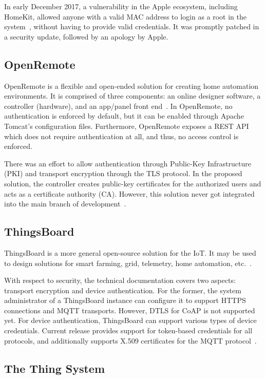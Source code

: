 \documentclass[12pt]{article}
\begin{document}
In early December 2017, a vulnerability in the Apple ecosystem, including HomeKit, allowed anyone with a valid MAC address to login as a root in the system~\cite{related_03}, without having to provide valid credentials. It was promptly patched in a security update, followed by an apology by Apple.

\subsection{OpenRemote}

OpenRemote is a flexible and open-ended solution for creating home automation environments. It is comprised of three components: an online designer software, a controller (hardware), and an app/panel front end~\cite{related_04}. In OpenRemote, no authentication is enforced by default, but it can be enabled through Apache Tomcat's configuration files. Furthermore, OpenRemote exposes a REST API which does not require authentication at all, and thus, no access control is enforced.

There was an effort to allow authentication through Public-Key Infrastructure (PKI) and transport encryption through the TLS protocol. In the proposed solution, the controller creates public-key certificates for the authorized users and acts as a certificate authority (CA). However, this solution never got integrated into the main branch of development~\cite{related_05}. 

\subsection{ThingsBoard}

ThingsBoard is a more general open-source solution for the IoT. It may be used to design solutions for smart farming, grid, telemetry, home automation, etc.~\cite{related_06}.

With respect to security, the technical documentation covers two aspects: transport encryption and device authentication. For the former, the system administrator of a ThingsBoard instance can configure it to support HTTPS connections and MQTT transports. However, DTLS for CoAP is not supported yet. For device authentication, ThingsBoard can support various types of device credentials. Current release provides support for token-based credentials for all protocols, and additionally supports X.509 certificates for the MQTT protocol~\cite{related_07}.

\subsection{The Thing System}
\end{document}
